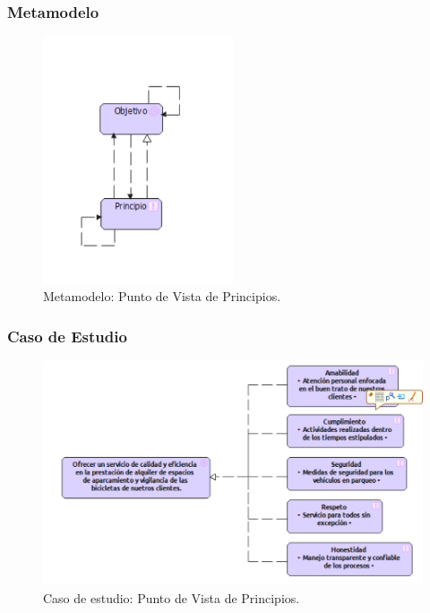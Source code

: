 \subsubsection{Metamodelo}
\begin{figure}[h]
	\centering
	\includegraphics[width=0.5\textwidth]{imagenes/Metamodelos/Motivacion/meta_Principios.pdf}
	\caption{Metamodelo: Punto de Vista de Principios.}
	\label{fig:gap_analysis}
\end{figure}

\subsubsection{Caso de Estudio}


\begin{figure}[h]
	\centering
	\includegraphics[width=1.0\textwidth]{imagenes/Caso_Estudio/Motivacion/Principios.PDF}
	\caption{Caso de estudio: Punto de Vista de Principios.}
	\label{fig:gap_analysis}
\end{figure}

